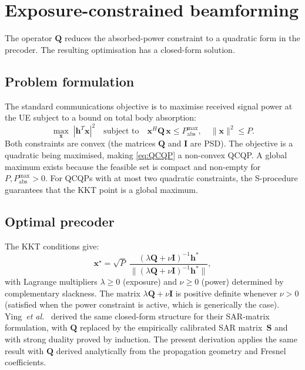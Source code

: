 \documentclass[11pt,a4paper]{article}
\theoremstyle{definition}      %
\begin{document}
\section{Exposure-constrained beamforming}\label{sec:ecbf}

The operator $\mathbf{Q}$ reduces the absorbed-power constraint to a
quadratic form in the precoder.  The resulting optimisation has a
closed-form solution.

\subsection{Problem formulation}\label{sec:ecbf-problem}

The standard communications objective is to maximise received signal
power at the UE subject to a bound on total body absorption:
\begin{equation}\label{eq:QCQP}
  \max_{\mathbf{x}}\; |\mathbf{h}^T\mathbf{x}|^2
  \quad\text{subject to}\quad
  \mathbf{x}^H\mathbf{Q}\,\mathbf{x} \leq P_\mathrm{abs}^\mathrm{max},
  \quad \|\mathbf{x}\|^2 \leq P.
\end{equation}
Both constraints are convex (the matrices $\mathbf{Q}$ and
$\mathbf{I}$ are PSD).  The objective is a quadratic being maximised,
making \cref{eq:QCQP} a non-convex QCQP.  A global maximum exists
because the feasible set is compact and non-empty for
$P, P_\mathrm{abs}^\mathrm{max} > 0$.  For QCQPs with at most two
quadratic constraints, the S-procedure guarantees that the KKT
point is a global maximum.

\subsection{Optimal precoder}\label{sec:ecbf-solution}

The KKT conditions give:
\begin{equation}\label{eq:optimal-x}
  \boxed{\mathbf{x}^\star = \sqrt{P}\;\frac{(\lambda\mathbf{Q} + \nu\mathbf{I})^{-1}\mathbf{h}^*}
  {\|(\lambda\mathbf{Q} + \nu\mathbf{I})^{-1}\mathbf{h}^*\|},}
\end{equation}
with Lagrange multipliers $\lambda \geq 0$ (exposure) and $\nu \geq
0$ (power) determined by complementary slackness.  The matrix
$\lambda\mathbf{Q} + \nu\mathbf{I}$ is positive definite whenever
$\nu > 0$ (satisfied when the power constraint is active, which is
generically the case).
Ying~\textit{et al.}~\cite{Ying2015} derived the same closed-form structure
for their SAR-matrix formulation, with $\mathbf{Q}$ replaced by the
empirically calibrated SAR matrix~$\mathbf{S}$ and with strong duality
proved by induction.  The present derivation applies the same result with
$\mathbf{Q}$ derived analytically from the propagation geometry and Fresnel
coefficients.
\end{document}
